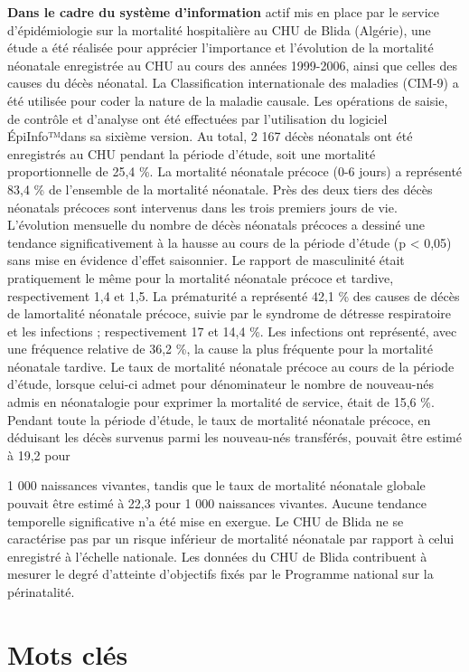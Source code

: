 \documentclass[
]{book}
\begin{document}
\textbf{Dans le cadre du système d'information} actif mis en place par le service
d'épidémiologie sur la mortalité hospitalière au CHU de Blida (Algérie), une
étude a été réalisée pour apprécier l'importance et l'évolution de la mortalité
néonatale enregistrée au CHU au cours des années 1999-2006, ainsi que celles des
causes du décès néonatal. La Classification internationale des maladies (CIM-9)
a été utilisée pour coder la nature de la maladie causale. Les opérations de
saisie, de contrôle et d'analyse ont été effectuées par l'utilisation du
logiciel ÉpiInfo™dans sa sixième version. Au total, 2 167 décès néonatals ont
été enregistrés au CHU pendant la période d'étude, soit une mortalité
proportionnelle de 25,4 \%. La mortalité néonatale précoce (0-6 jours) a
représenté 83,4 \% de l'ensemble de la mortalité néonatale. Près des deux tiers
des décès néonatals précoces sont intervenus dans les trois premiers jours de
vie. L'évolution mensuelle du nombre de décès néonatals précoces a dessiné une
tendance significativement à la hausse au cours de la période d'étude (p \textless{}
0,05) sans mise en évidence d'effet saisonnier. Le rapport de masculinité était
pratiquement le même pour la mortalité néonatale précoce et tardive,
respectivement 1,4 et 1,5. La prématurité a représenté 42,1 \% des causes de
décès de lamortalité néonatale précoce, suivie par le syndrome de détresse
respiratoire et les infections ; respectivement 17 et 14,4 \%. Les infections ont
représenté, avec une fréquence relative de 36,2 \%, la cause la plus fréquente
pour la mortalité néonatale tardive. Le taux de mortalité néonatale précoce au
cours de la période d'étude, lorsque celui-ci admet pour dénominateur le nombre
de nouveau-nés admis en néonatalogie pour exprimer la mortalité de service,
était de 15,6 \%. Pendant toute la période d'étude, le taux de mortalité
néonatale précoce, en déduisant les décès survenus parmi les nouveau-nés
transférés, pouvait être estimé à 19,2 pour

1 000 naissances vivantes, tandis que le taux de mortalité néonatale globale
pouvait être estimé à 22,3 pour 1 000 naissances vivantes. Aucune tendance
temporelle significative n'a été mise en exergue. Le CHU de Blida ne se
caractérise pas par un risque inférieur de mortalité néonatale par rapport à
celui enregistré à l'échelle nationale. Les données du CHU de Blida contribuent
à mesurer le degré d'atteinte d'objectifs fixés par le Programme national sur la
périnatalité.

\hypertarget{mots-cluxe9s}{%
\section{Mots clés}\label{mots-cluxe9s}}
\end{document}

